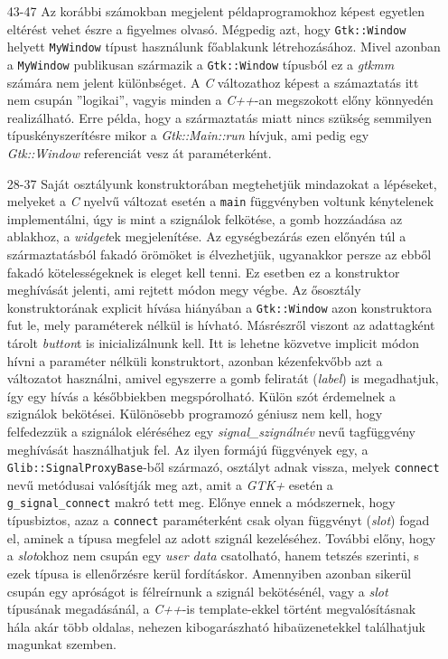 \begin{enumerate}
 \item[43-47] Az korábbi számokban megjelent példaprogramokhoz képest egyetlen eltérést vehet észre a figyelmes olvasó. Mégpedig azt, hogy \texttt{Gtk::Window} helyett \texttt{MyWindow} típust használunk főablakunk létrehozásához. Mivel azonban a \texttt{MyWindow} publikusan származik a \texttt{Gtk::Window} típusból ez a \textit{gtkmm } számára nem jelent különbséget. A \textit{C} változathoz képest a számaztatás itt nem csupán ''logikai'', vagyis minden a \textit{C++}-an megszokott előny könnyedén realizálható. Erre példa, hogy a származtatás miatt nincs szükség semmilyen típuskényszerítésre mikor a \textit{Gtk::Main::run} hívjuk, ami pedig egy \textit{Gtk::Window} referenciát vesz át paraméterként.

 \item[28-37] Saját osztályunk konstruktorában megtehetjük mindazokat a lépéseket, melyeket a \textit{C} nyelvű változat esetén a \texttt{main} függvényben voltunk kénytelenek implementálni, úgy is mint a szignálok felkötése, a gomb hozzáadása az ablakhoz, a \textit{widget}ek megjelenítése. Az egységbezárás ezen előnyén túl a származtatásból fakadó örömöket is élvezhetjük, ugyanakkor persze az ebből fakadó kötelességeknek is eleget kell tenni. Ez esetben ez a konstruktor meghívását jelenti, ami rejtett módon megy végbe. Az ősosztály konstruktorának explicit hívása hiányában a \texttt{Gtk::Window} azon konstruktora fut le, mely paraméterek nélkül is hívható. Másrészről viszont az adattagként tárolt \textit{button}t is inicializálnunk kell. Itt is lehetne közvetve implicit módon hívni a paraméter nélküli konstruktort, azonban kézenfekvőbb azt a változatot használni, amivel egyszerre a gomb feliratát (\textit{label}) is megadhatjuk, így egy hívás a későbbiekben megspórolható. Külön szót érdemelnek a szignálok bekötései. Különösebb programozó géniusz nem kell, hogy felfedezzük a szignálok eléréséhez egy \textit{signal\_}\textit{szignálnév} nevű tagfüggvény meghívását használhatjuk fel. Az ilyen formájú függvények egy, a \texttt{Glib::SignalProxyBase}-ből származó, osztályt adnak vissza, melyek \texttt{connect} nevű metódusai valósítják meg azt, amit a \textit{GTK+} esetén a \texttt{g\_signal\_connect} makró tett meg. Előnye ennek a módszernek, hogy típusbiztos, azaz a \texttt{connect} paraméterként csak olyan függvényt (\textit{slot}) fogad el, aminek a típusa megfelel az adott szignál kezeléséhez. További előny, hogy a \textit{slot}okhoz nem csupán egy \textit{user data} csatolható, hanem tetszés szerinti, s ezek típusa is ellenőrzésre kerül fordításkor. Amennyiben azonban sikerül csupán egy apróságot is félreírnunk a szignál bekötésénél, vagy a \textit{slot} típusának megadásánál, a \textit{C++}-is template-ekkel történt megvalósításnak hála akár több oldalas, nehezen kibogarászható hibaüzenetekkel találhatjuk magunkat szemben.


\end{enumerate}
